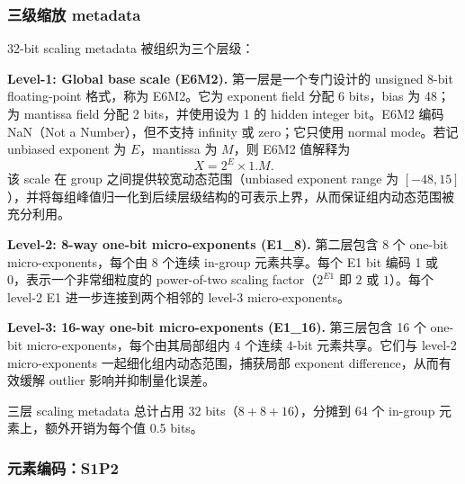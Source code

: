 \documentclass{article}
\begin{document}

\subsubsection{三级缩放 metadata}

32-bit scaling metadata 被组织为三个层级：

\textbf{Level-1: Global base scale (E6M2).}
第一层是一个专门设计的 unsigned 8-bit floating-point 格式，称为 E6M2。它为 exponent field 分配 6 bits，bias
为 48；为 mantissa field 分配 2 bits，并使用设为 1 的 hidden integer bit。E6M2 编码 NaN（Not a Number），但不支持
infinity 或 zero；它只使用 normal mode。若记 unbiased exponent 为 $E$，mantissa 为 $M$，则 E6M2 值解释为
\begin{equation}
  X = 2^{E} \times 1.M .
  \label{eq:e6m2}
\end{equation}
该 scale 在 group 之间提供较宽动态范围（unbiased exponent range 为 $[-48, 15]$），并将每组峰值归一化到后续层级结构的可表示上界，从而保证组内动态范围被充分利用。

\textbf{Level-2: 8-way one-bit micro-exponents (E1\_8).}
第二层包含 8 个 one-bit micro-exponents，每个由 8 个连续 in-group 元素共享。每个 E1 bit 编码 1 或 0，表示一个非常细粒度的
power-of-two scaling factor（$2^{E1}$ 即 $2$ 或 $1$）。每个 level-2 E1 进一步连接到两个相邻的 level-3 micro-exponents。

\textbf{Level-3: 16-way one-bit micro-exponents (E1\_16).}
第三层包含 16 个 one-bit micro-exponents，每个由其局部组内 4 个连续 4-bit 元素共享。它们与 level-2 micro-exponents
一起细化组内动态范围，捕获局部 exponent difference，从而有效缓解 outlier 影响并抑制量化误差。

三层 scaling metadata 总计占用 32 bits（$8 + 8 + 16$），分摊到 64 个 in-group 元素上，额外开销为每个值 0.5 bits。


\subsubsection{元素编码：S1P2}
\end{document}
